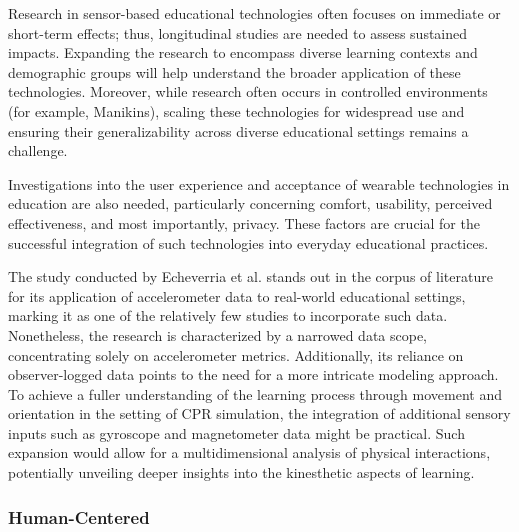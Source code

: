\documentclass[manuscript,screen,review]{acmart}
\begin{document}
Research in sensor-based educational technologies often focuses on immediate or short-term effects; thus, longitudinal studies are needed to assess sustained impacts. Expanding the research to encompass diverse learning contexts and demographic groups will help understand the broader application of these technologies. Moreover, while research often occurs in controlled environments (for example, Manikins), scaling these technologies for widespread use and ensuring their generalizability across diverse educational settings remains a challenge.

Investigations into the user experience and acceptance of wearable technologies in education are also needed, particularly concerning comfort, usability, perceived effectiveness, and most importantly, privacy. These factors are crucial for the successful integration of such technologies into everyday educational practices.

The study conducted by Echeverria et al. \cite{1296637108} stands out in the corpus of literature for its application of accelerometer data to real-world educational settings, marking it as one of the relatively few studies to incorporate such data. Nonetheless, the research is characterized by a narrowed data scope, concentrating solely on accelerometer metrics. Additionally, its reliance on observer-logged data points to the need for a more intricate modeling approach. To achieve a fuller understanding of the learning process through movement and orientation in the setting of CPR simulation, the integration of additional sensory inputs such as gyroscope and magnetometer data might be practical. Such expansion would allow for a multidimensional analysis of physical interactions, potentially unveiling deeper insights into the kinesthetic aspects of learning.

\subsubsection{Human-Centered}


\end{document}
